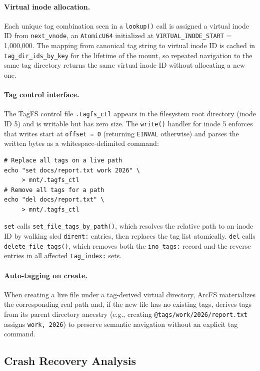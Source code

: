 \documentclass[journal]{IEEEtran}
\begin{document}
\paragraph{Virtual inode allocation.}
Each unique tag combination seen in a \texttt{lookup()} call is assigned
a virtual inode ID from \texttt{next\_vnode}, an \texttt{AtomicU64}
initialized at \texttt{VIRTUAL\_INODE\_START} = 1,000,000.  The
mapping from canonical tag string to virtual inode ID is cached in
\texttt{tag\_dir\_ids\_by\_key} for the lifetime of the mount, so
repeated navigation to the same tag directory returns the same virtual
inode ID without allocating a new one.

\paragraph{Tag control interface.}
The TagFS control file \texttt{.tagfs\_ctl} appears in the filesystem
root directory (inode ID 5) and is writable but has zero size.  The
\texttt{write()} handler for inode 5 enforces that writes start at
\texttt{offset = 0} (returning \texttt{EINVAL} otherwise) and parses
the written bytes as a whitespace-delimited command:
\begin{lstlisting}
# Replace all tags on a live path
echo "set docs/report.txt work 2026" \
     > mnt/.tagfs_ctl
# Remove all tags for a path
echo "del docs/report.txt" \
     > mnt/.tagfs_ctl
\end{lstlisting}
\texttt{set} calls \texttt{set\_file\_tags\_by\_path()}, which resolves
the relative path to an inode ID by walking sled \texttt{dirent:}
entries, then replaces the tag list atomically.  \texttt{del} calls
\texttt{delete\_file\_tags()}, which removes both the
\texttt{ino\_tags:} record and the reverse entries in all affected
\texttt{tag\_index:} sets.

\paragraph{Auto-tagging on create.}
When creating a live file under a tag-derived virtual directory, ArcFS
materializes the corresponding real path and, if the new file has no
existing tags, derives tags from its parent directory ancestry (e.g.,
creating \texttt{@tags/work/2026/report.txt} assigns \texttt{work, 2026})
to preserve semantic navigation without an explicit tag command.

\subsection{Crash Recovery Analysis}
\label{sec:crash}
\end{document}
